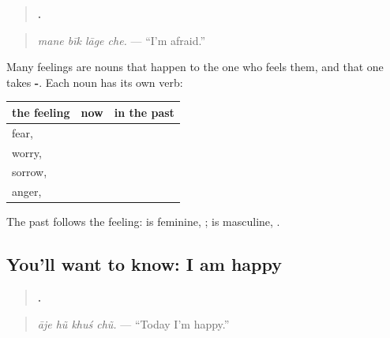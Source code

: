\begin{grammarlens}[title={Grammar Lens: a feeling that comes to me}]
\begin{quote}
\textbf{   .}
\end{quote}

\begin{quote}
\emph{mane bīk lāge che.} — \textquotedblleft{}I'm afraid.\textquotedblright{}
\end{quote}

Many feelings are nouns that happen to the one who feels them, and that one takes \textbf{-}. Each noun has its own verb:

\noindent
\begin{tabularx}{\linewidth}{@{}>{\raggedright\arraybackslash}X>{\raggedright\arraybackslash}X>{\raggedright\arraybackslash}X@{}}
\toprule
\textbf{the feeling} & \textbf{now} & \textbf{in the past} \\
\midrule
fear, \textbf{\gu{બીક}} & \textbf{\gu{મને} \gu{બીક} \gu{લાગે} \gu{છે}} & \textbf{\gu{મને} \gu{બીક} \gu{લાગી}} \\
worry, \textbf{\gu{ચિંતા}} & \textbf{\gu{મને} \gu{ચિંતા} \gu{થાય} \gu{છે}} & \textbf{\gu{મને} \gu{ચિંતા} \gu{થઈ}} \\
sorrow, \textbf{\gu{દુઃખ}} & \textbf{\gu{મને} \gu{દુઃખ} \gu{થાય} \gu{છે}} & \textbf{\gu{મને} \gu{દુઃખ} \gu{થયું}} \\
anger, \textbf{\gu{ગુસ્સો}} & \textbf{\gu{મને} \gu{ગુસ્સો} \gu{આવે} \gu{છે}} & \textbf{\gu{મને} \gu{ગુસ્સો} \gu{આવ્યો}} \\
\bottomrule
\end{tabularx}

The past follows the feeling: \textbf{} is feminine, \textbf{}; \textbf{} is masculine, \textbf{}.
\end{grammarlens}

\subsection*{You'll want to know: I am happy}
\begin{quote}
\textbf{   .}
\end{quote}

\begin{quote}
\emph{āje hũ khuś chũ.} — \textquotedblleft{}Today I'm happy.\textquotedblright{}
\end{quote}

